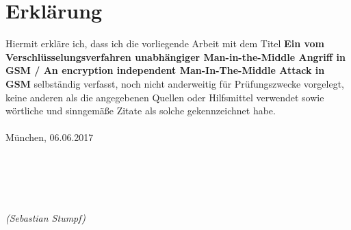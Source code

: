 \chapter*{Erklärung}
\thispagestyle{empty}
\vspace*{\fill}

\noindent Hiermit erkläre ich, dass ich die vorliegende Arbeit mit dem Titel \textbf{Ein vom Verschlüsselungsverfahren unabhängiger Man-in-the-Middle Angriff in GSM / An encryption independent Man-In-The-Middle Attack in GSM} selbständig  verfasst, noch nicht anderweitig für Prüfungszwecke vorgelegt, keine  anderen als die angegebenen Quellen oder Hilfsmittel verwendet sowie wörtliche und  sinngemäße Zitate als solche gekennzeichnet habe.\\\\
München, 06.06.2017\\\\\\\\\\\\
\noindent \textit{(Sebastian Stumpf)}